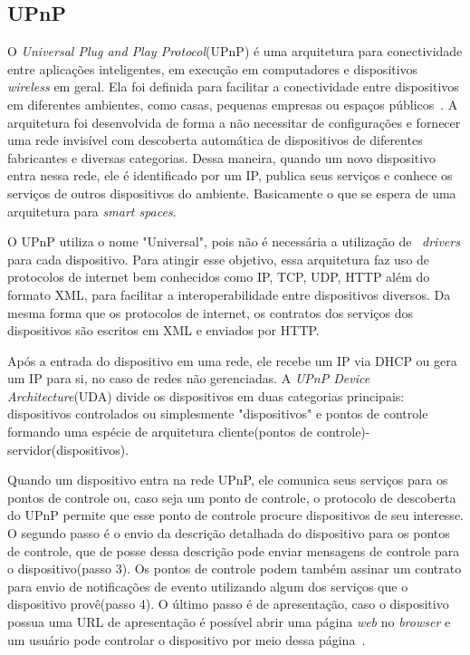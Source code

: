 \subsection{UPnP}
O \emph{Universal Plug and Play Protocol}(UPnP) é uma arquitetura para conectividade entre aplicações inteligentes, em execução em computadores e dispositivos \emph{wireless} em geral. Ela foi definida para facilitar a conectividade entre dispositivos em diferentes ambientes, como casas, pequenas empresas ou espaços públicos~\cite{upnpArch}. A arquitetura foi desenvolvida de forma a não necessitar de configurações e fornecer uma rede invisível com descoberta automática de dispositivos de diferentes fabricantes e diversas categorias. Dessa maneira, quando um novo dispositivo entra nessa rede, ele é identificado por um IP, publica seus serviços e conhece os serviços de outros dispositivos do ambiente. Basicamente o que se espera de uma arquitetura para \emph{smart spaces}. 

O UPnP utiliza o nome "Universal", pois não é necessária a utilização de ~\emph{drivers} para cada dispositivo. Para atingir esse objetivo, essa arquitetura faz uso de protocolos de internet bem conhecidos como IP, TCP, UDP, HTTP além do formato XML, para facilitar a interoperabilidade entre dispositivos diversos. Da mesma forma que os protocolos de internet, os contratos dos serviços dos dispositivos são escritos em XML e enviados por HTTP.

Após a entrada do dispositivo em uma rede, ele recebe um IP via DHCP ou gera um IP para si, no caso de redes não gerenciadas. A \emph{UPnP Device Architecture}(UDA) divide os dispositivos em duas categorias principais: dispositivos controlados ou simplesmente "dispositivos" e pontos de controle~\cite{upnpArch} formando uma espécie de arquitetura cliente(pontos de controle)-servidor(dispositivos). 

Quando um dispositivo entra na rede UPnP, ele comunica seus serviços para os pontos de controle ou, caso seja um ponto de controle, o protocolo de descoberta do UPnP permite que esse ponto de controle procure dispositivos de seu interesse. O segundo passo é o envio da descrição detalhada do dispositivo para os pontos de controle, que de posse dessa descrição pode enviar mensagens de controle para o dispositivo(passo 3). Os pontos de controle podem também assinar um contrato para envio de notificações de evento utilizando algum dos serviços que o dispositivo provê(passo 4). O último passo é de apresentação, caso o dispositivo possua uma URL de apresentação é possível abrir uma página \emph{web} no \emph{browser} e um usuário pode controlar o dispositivo por meio dessa página~\cite{upnpArch}.

